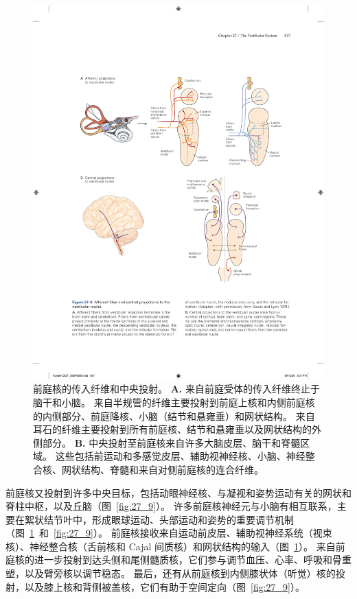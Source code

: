 \begin{figure}[htbp]
	\centering
	\includegraphics[width=0.8\linewidth]{chap27/fig_27_8}
	\caption{前庭核的传入纤维和中央投射。
		\textbf{A.} 来自前庭受体的传入纤维终止于脑干和小脑。
		来自半规管的纤维主要投射到前庭上核和内侧前庭核的内侧部分、前庭降核、小脑（结节和悬雍垂）和网状结构。
		来自耳石的纤维主要投射到所有前庭核、结节和悬雍垂以及网状结构的外侧部分\cite{gacek1974localization}。
		\textbf{B.} 中央投射至前庭核来自许多大脑皮层、脑干和脊髓区域。
		这些包括前运动和多感觉皮层、辅助视神经核、小脑、神经整合核、网状结构、脊髓和来自对侧前庭核的连合纤维。}
	\label{fig:27_8}
\end{figure}


前庭核又投射到许多中央目标，包括动眼神经核、与凝视和姿势运动有关的网状和脊柱中枢，以及丘脑（图~\ref{fig:27_9}）。
许多前庭核神经元与小脑有相互联系，主要在絮状结节叶中，形成眼球运动、头部运动和姿势的重要调节机制（图~\ref{fig:27_8}~和~\ref{fig:27_9}）。
前庭核接收来自运动前皮层、辅助视神经系统（视束核）、神经整合核（舌前核和 Cajal 间质核）和网状结构的输入（图~\ref{fig:27_8}）。
来自前庭核的进一步投射到达头侧和尾侧髓质核，它们参与调节血压、心率、呼吸和骨重塑，以及臂旁核以调节稳态。
最后，还有从前庭核到内侧膝状体（听觉）核的投射，以及膝上核和背侧被盖核，它们有助于空间定向（图~\ref{fig:27_9}）。


